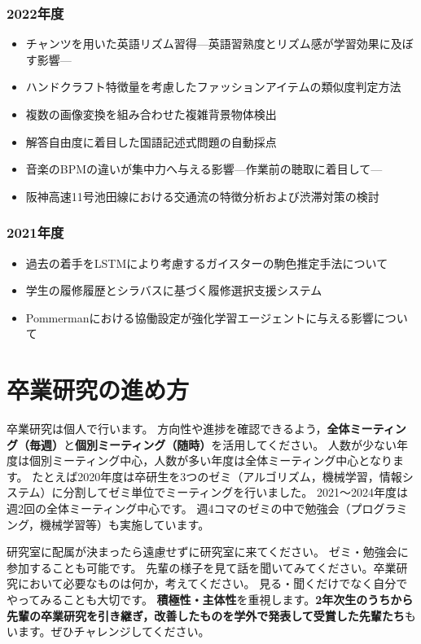 \documentclass[paper=a4paper,fontsize=10.4pt]{jlreq}
\renewcommand{\emph}[1]{\textbf{#1}}
\begin{document}
\begin{tcolorbox}
\begin{multicols}{2}
\subsubsection*{2022年度}
\begin{itemize}[leftmargin=3mm]
  \item チャンツを用いた英語リズム習得---英語習熟度とリズム感が学習効果に及ぼす影響---
  \item ハンドクラフト特徴量を考慮したファッションアイテムの類似度判定方法
  \item 複数の画像変換を組み合わせた複雑背景物体検出
  \item 解答自由度に着目した国語記述式問題の自動採点
  \item 音楽のBPMの違いが集中力へ与える影響---作業前の聴取に着目して---
  \item 阪神高速11号池田線における交通流の特徴分析および渋滞対策の検討
\end{itemize}
\subsubsection*{2021年度}
\begin{itemize}[leftmargin=3mm]
  \item 過去の着手をLSTMにより考慮するガイスターの駒色推定手法について
  \item 学生の履修履歴とシラバスに基づく履修選択支援システム
  \item Pommermanにおける協働設定が強化学習エージェントに与える影響について
\end{itemize}
\end{multicols}
\end{tcolorbox}

\clearpage
\section{卒業研究の進め方}

卒業研究は個人で行います。
方向性や進捗を確認できるよう，\emph{全体ミーティング（毎週）}と\emph{個別ミーティング（随時）}を活用してください。
人数が少ない年度は個別ミーティング中心，人数が多い年度は全体ミーティング中心となります。
たとえば2020年度は卒研生を3つのゼミ（アルゴリズム，機械学習，情報システム）に分割してゼミ単位でミーティングを行いました。
2021～2024年度は週2回の全体ミーティング中心です。
週4コマのゼミの中で勉強会（プログラミング，機械学習等）も実施しています。

研究室に配属が決まったら遠慮せずに研究室に来てください。
ゼミ・勉強会に参加することも可能です。
先輩の様子を見て話を聞いてみてください。卒業研究において必要なものは何か，考えてください。
見る・聞くだけでなく自分でやってみることも大切です。
\emph{積極性・主体性}を重視します。\emph{2年次生のうちから先輩の卒業研究を引き継ぎ，改善したものを学外で発表して受賞した先輩たち}もいます。ぜひチャレンジしてください。
\end{document}
